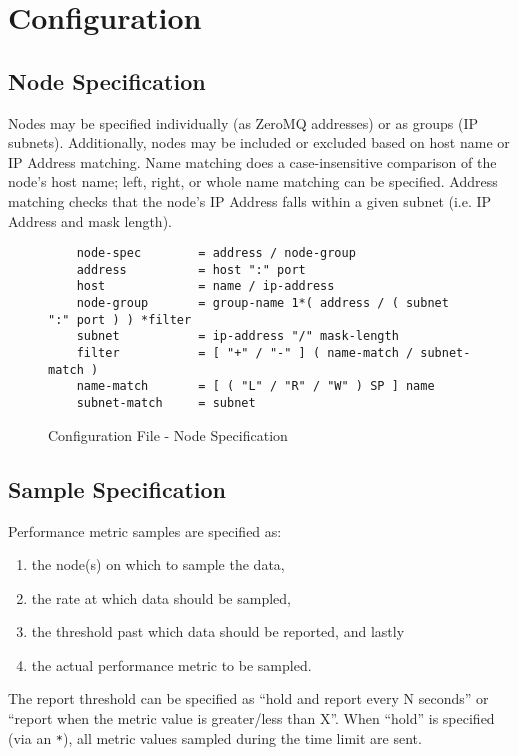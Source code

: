 \section{Configuration}
\label{configuration}

\subsection{Node Specification}

Nodes may be specified individually (as ZeroMQ addresses) or as groups (IP subnets). Additionally, nodes may be included
or excluded based on host name or IP Address matching. Name matching does a case-insensitive comparison of the node's
host name; left, right, or whole name matching can be specified. Address matching checks that the node's IP Address
falls within a given subnet (i.e. IP Address and mask length).

\begin{figure}[ht]
    \begin{lstlisting}
    node-spec        = address / node-group
    address          = host ":" port
    host             = name / ip-address
    node-group       = group-name 1*( address / ( subnet ":" port ) ) *filter
    subnet           = ip-address "/" mask-length
    filter           = [ "+" / "-" ] ( name-match / subnet-match )
    name-match       = [ ( "L" / "R" / "W" ) SP ] name
    subnet-match     = subnet
    \end{lstlisting}
    \caption{Configuration File - Node Specification}
    \label{fig:config_file_node}
\end{figure}

\subsection{Sample Specification}

Performance metric samples are specified as:

\begin{enumerate}
\item the node(s) on which to sample the data,
\item the rate at which data should be sampled,
\item the threshold past which data should be reported, and lastly
\item the actual performance metric to be sampled.
\end{enumerate}

The report threshold can be specified as ``hold and report every N seconds'' or ``report when the metric value is
greater/less than X''. When ``hold'' is specified (via an \texttt{*}), all metric values sampled during the time limit
are sent.


